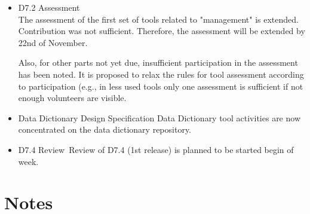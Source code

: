 \documentclass[a4paper, 11pt]{article}
\begin{document}
\begin{itemize}
\item D7.2 Assessment\\
The assessment of the first set of tools related to "management" is extended. Contribution was not sufficient. Therefore, the assessment will be extended by 22nd of November.

Also, for other parts not yet due, insufficient participation in the assessment has been noted. It is proposed to relax the rules for tool assessment according to participation (e.g., in less used tools only one assessment is sufficient if not enough volunteers are visible.

\item Data Dictionary Design Specification
Data Dictionary tool activities are now concentrated on the data dictionary repository.

\item D7.4 Review\
Review of D7.4 (1st release) is planned to be started begin of week.

\end{itemize}

\section{Notes}
\end{document}
